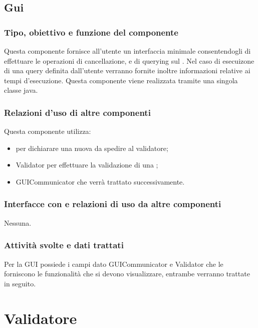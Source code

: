\documentclass[11pt,titlepage,a4paper]{report}
\begin{document}
\subsection{Gui}
\subsubsection{Tipo, obiettivo e funzione del componente}
Questa componente fornisce all'utente un interfaccia minimale consentendogli di effettuare le operazioni di cancellazione, e di querying sul \re.
Nel caso di esecuizone di una query definita dall'utente verranno fornite inoltre informazioni relative ai tempi d'esecuzione.
Questa componente viene realizzata tramite una singola classe java.
\subsubsection{Relazioni d'uso di altre componenti}
Questa componente utilizza:
\begin{itemize}
 \item \BR per dichiarare una nuova \br da spedire al validatore;
 \item Validator per effettuare la validazione di una \br;
 \item GUICommunicator che verr\`a trattato successivamente.
\end{itemize}
\subsubsection{Interfacce con e relazioni di uso da altre componenti}
Nessuna.
\subsubsection{Attivit\`a svolte e dati trattati}
Per la GUI possiede i campi dato GUICommunicator e Validator che le forniscono le funzionalit\`a che si devono visualizzare, entrambe verranno trattate in seguito.

\section{Validatore}
\end{document}

